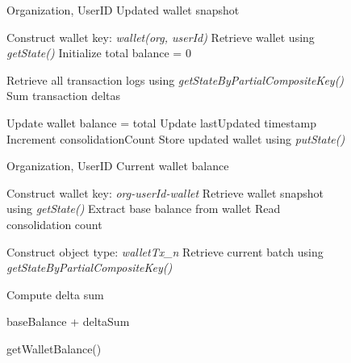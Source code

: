 \documentclass[12pt]{article}
\begin{document}
	
	\begin{figure}[h]
		\centering
		\caption{Wallet Consolidation and Balance Retrieval Mechanisms}
		\label{fig:wallet_consolidation_balance}
		
		\begin{minipage}[t]{0.48\linewidth}
			\vspace{0pt}
			\centering
			\begin{algorithm}[H]
				\caption{consolidateWallet()}
				\begin{algorithmic}[1]
					
					\Require Organization, UserID
					\Ensure Updated wallet snapshot
					
					\State Construct wallet key: \textit{wallet(org, userId)}
					\State Retrieve wallet using \textit{getState()}
					\State Initialize total balance = 0
					
					\State Retrieve all transaction logs using \textit{getStateByPartialCompositeKey()}
					\State Sum transaction deltas
					\EndFor
					
					\State Update wallet balance = total
					\State Update lastUpdated timestamp
					\State Increment consolidationCount
					\State Store updated wallet using \textit{putState()}
					
				\end{algorithmic}
			\end{algorithm}
		\end{minipage}
		\hfill
		\begin{minipage}[t]{0.48\linewidth}
			\vspace{0pt}
			\centering
			\begin{algorithm}[H]
				\caption{getWalletBalance()}
				\begin{algorithmic}[1]
					
					\Require Organization, UserID
					\Ensure Current wallet balance
					
					\State Construct wallet key: \textit{org-userId-wallet}
					\State Retrieve wallet snapshot using \textit{getState()}
					\State Extract base balance from wallet
					\State Read consolidation count
					
					\State Construct object type: \textit{walletTx\_n}
					\State Retrieve current batch using \textit{getStateByPartialCompositeKey()}
					
					\For{each transaction entry}
					\State Compute delta sum
					\EndFor
					
					\State \Return baseBalance + deltaSum
					
				\end{algorithmic}
			\end{algorithm}
		\end{minipage}
		
	\end{figure}
	
\end{document}
